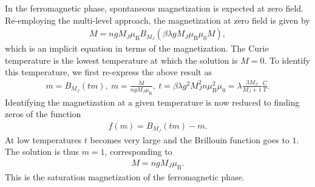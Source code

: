 In the ferromagnetic phase, spontaneous magnetization is expected at zero field. Re-employing the multi-level approach, the magnetization at zero field is given by
\begin{align*}
	M = ngM_{J}\mu_{\text{B}}B_{M_{J}}\left(\beta\lambda gM_{J}\mu_{\text{B}}\mu_{0}M\right),
\end{align*}
which is an implicit equation in terms of the magnetization. The Curie temperature is the lowest temperature at which the solution is $M = 0$. To identify this temperature, we first re-express the above result as
\begin{align*}
	m = B_{M_{J}}\left(tm\right),\ m = \frac{M}{ngM_{J}\mu_{\text{B}}},\ t = \beta\lambda g^{2}M_{J}^{2}n\mu_{\text{B}}^{2}\mu_{0} = \lambda\frac{3M_{J}}{M_{J} + 1}\frac{C}{T}.
\end{align*}
Identifying the magnetization at a given temperature is now reduced to finding zeros of the function
\begin{align*}
	f(m) = B_{M_{J}}\left(tm\right) - m.
\end{align*}
At low temperatures $t$ becomes very large and the Brillouin function goes to $1$. The solution is thus $m = 1$, corresponding to
\begin{align*}
	M = ngM_{J}\mu_{\text{B}}.
\end{align*}
This is the saturation magnetization of the ferromagnetic phase.

